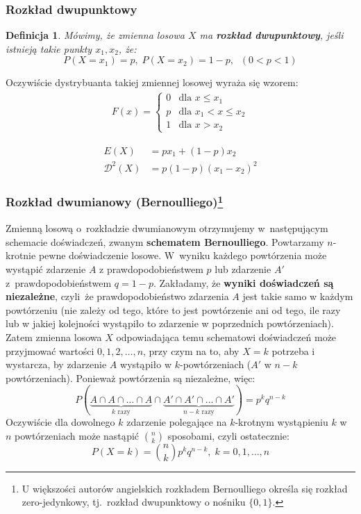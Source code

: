 \documentclass[10pt,a4paper]{article}
\newtheorem{definition}{Definicja}[section]
\numberwithin{equation}{subsection}
\begin{document}
\subsubsection{Rozkład dwupunktowy}
\begin{definition}
  Mówimy, że zmienna losowa $X$ ma \textbf{rozkład dwupunktowy}, jeśli istnieją
  takie punkty $x_1, x_2$, że:
  \begin{equation}
    P(X=x_1)=p,\;P(X=x_2)=1-p,\;\;(0<p<1)
  \end{equation}
\end{definition}

Oczywiście dystrybuanta takiej zmiennej losowej wyraża się wzorem:
\begin{eqnarray}
  F(x) = \begin{cases}
    0 & \text{dla } x \leq x_1 \\
    p & \text{dla } x_1 < x \leq x_2 \\
    1 & \text{dla } x > x_2
  \end{cases}
\end{eqnarray}

\begin{align*}
  E(X) &= px_1 + (1 - p)x_2 \\
  \mathscr{D}^2(X) &= p(1 - p)(x_1 - x_2)^2
\end{align*}

\subsubsection{Rozkład dwumianowy (Bernoulliego)\footnote{U większości autorów
  angielskich rozkładem Bernoulliego określa się rozkład zero-jedynkowy,
  tj.~rozkład dwupunktowy o nośniku $\{0,1\}$.}}
Zmienną losową o~rozkładzie dwumianowym otrzymujemy w~następującym schemacie
doświadczeń, zwanym \textbf{schematem Bernoulliego}. Powtarzamy $n$-krotnie
pewne doświadczenie losowe. W~wyniku każdego powtórzenia może wystąpić zdarzenie
$A$ z prawdopodobieństwem $p$ lub zdarzenie $A'$ z~prawdopodobieństwem $q=1-p$.
Zakładamy, że \textbf{wyniki doświadczeń są niezależne}, czyli~że
prawdopodobieństwo zdarzenia $A$ jest takie samo w każdym powtórzeniu
(nie zależy od tego, które to jest powtórzenie ani od tego, ile razy lub
w jakiej kolejności wystąpiło to zdarzenie w poprzednich powtórzeniach). Zatem
zmienna losowa $X$ odpowiadająca temu schematowi doświadczeń może przyjmować
wartości $0,1,2,\ldots,n$, przy czym na to, aby $X=k$ potrzeba i wystarcza,
by zdarzenie $A$ wystąpiło w $k$-powtórzeniach ($A'$ w $n-k$ powtórzeniach).
Ponieważ powtórzenia są niezależne, więc:
\[
  P(\underbrace{A\cap A\cap\ldots\cap A}_{k\textrm{~razy}}\cap
  \underbrace{A'\cap A'\cap\ldots\cap A' }_{n-k\textrm{~razy}}) = p^kq^{n-k}
\]
Oczywiście dla dowolnego $k$ zdarzenie polegające na $k$-krotnym wystąpieniu
$k$ w~$n$ powtórzeniach może nastąpić $n \choose k$ sposobami,
czyli ostatecznie:
\begin{equation} \label{eq:binom}
  P(X=k) = {n\choose k} p^kq^{n-k},\;k=0,1,\dotsc,n
\end{equation}
\end{document}

